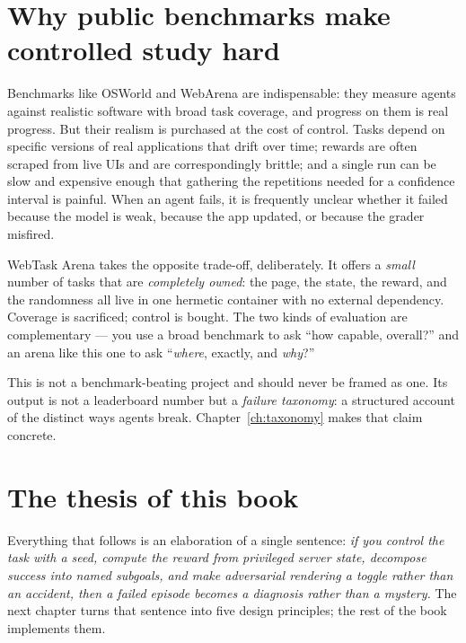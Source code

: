 \documentclass[11pt,openany]{book}
\begin{document}
\section{Why public benchmarks make controlled study hard}

Benchmarks like OSWorld and WebArena are indispensable: they measure agents
against realistic software with broad task coverage, and progress on them is real
progress. But their realism is purchased at the cost of control. Tasks depend on
specific versions of real applications that drift over time; rewards are often
scraped from live UIs and are correspondingly brittle; and a single run can be
slow and expensive enough that gathering the repetitions needed for a confidence
interval is painful. When an agent fails, it is frequently unclear whether it
failed because the model is weak, because the app updated, or because the grader
misfired.

WebTask Arena takes the opposite trade-off, deliberately. It offers a \emph{small}
number of tasks that are \emph{completely owned}: the page, the state, the reward,
and the randomness all live in one hermetic container with no external
dependency. Coverage is sacrificed; control is bought. The two kinds of
evaluation are complementary — you use a broad benchmark to ask ``how capable,
overall?'' and an arena like this one to ask ``\emph{where}, exactly, and
\emph{why}?''

\begin{notebox}[.\ ]
This is not a benchmark-beating project and should never be framed as one. Its
output is not a leaderboard number but a \emph{failure taxonomy}: a structured
account of the distinct ways agents break. Chapter~\ref{ch:taxonomy} makes that
claim concrete.
\end{notebox}

\section{The thesis of this book}

Everything that follows is an elaboration of a single sentence: \emph{if you
control the task with a seed, compute the reward from privileged server state,
decompose success into named subgoals, and make adversarial rendering a toggle
rather than an accident, then a failed episode becomes a diagnosis rather than a
mystery.} The next chapter turns that sentence into five design principles; the
rest of the book implements them.
\end{document}
